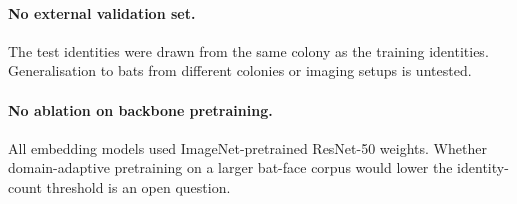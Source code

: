 \paragraph{No external validation set.}
The test identities were drawn from the same colony as the training identities.
Generalisation to bats from different colonies or imaging setups is untested.

\paragraph{No ablation on backbone pretraining.}
All embedding models used ImageNet-pretrained ResNet-50 weights.  Whether
domain-adaptive pretraining on a larger bat-face corpus would lower the identity-count
threshold is an open question.
